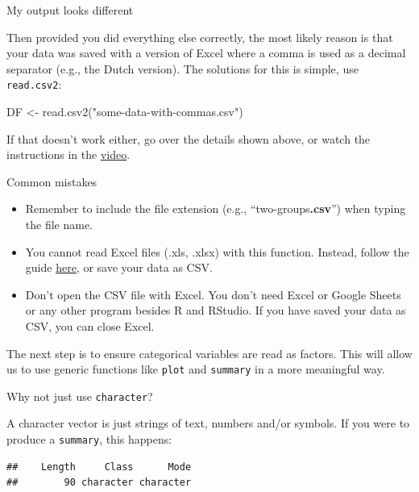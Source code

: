 \documentclass[
]{book}
\newenvironment{Shaded}{\begin{snugshade}}{\end{snugshade}}
\newcommand{\FunctionTok}[1]{\textcolor[rgb]{0.00,0.00,0.00}{#1}}
\newcommand{\NormalTok}[1]{#1}
\newcommand{\OtherTok}[1]{\textcolor[rgb]{0.56,0.35,0.01}{#1}}
\newcommand{\SpecialCharTok}[1]{\textcolor[rgb]{0.00,0.00,0.00}{#1}}
\newcommand{\StringTok}[1]{\textcolor[rgb]{0.31,0.60,0.02}{#1}}
\providecommand{\tightlist}{%
  \setlength{\itemsep}{0pt}\setlength{\parskip}{0pt}}
\begin{document}
My output looks different

Then provided you did everything else correctly, the most likely reason is that your data was saved with a version of Excel where a comma is used as a decimal separator (e.g., the Dutch version). The solutions for this is simple, use \texttt{read.csv2}:

\begin{Shaded}
\begin{Highlighting}[]
\NormalTok{DF }\OtherTok{\textless{}{-}} \FunctionTok{read.csv2}\NormalTok{(}\StringTok{"some{-}data{-}with{-}commas.csv"}\NormalTok{)}
\end{Highlighting}
\end{Shaded}

If that doesn't work either, go over the details shown above, or watch the instructions in the \href{https://youtu.be/BGUqZc-Pb8w}{video}.

Common mistakes

\begin{itemize}
\tightlist
\item
  Remember to include the file extension (e.g., ``two-groups\textbf{.csv}'') when typing the file name.
\item
  You cannot read Excel files (.xls, .xlsx) with this function. Instead, follow the guide \protect\hyperlink{read}{here}, or save your data as CSV.
\item
  Don't open the CSV file with Excel. You don't need Excel or Google Sheets or any other program besides R and RStudio. If you have saved your data as CSV, you can close Excel.
\end{itemize}

The next step is to ensure categorical variables are read as factors. This will allow us to use generic functions like \texttt{plot} and \texttt{summary} in a more meaningful way.

Why not just use \texttt{character}?

A character vector is just strings of text, numbers and/or symbols. If you were to produce a \texttt{summary}, this happens:

\begin{Shaded}
\end{Shaded}

\begin{verbatim}
##    Length     Class      Mode 
##        90 character character
\end{verbatim}
\end{document}
